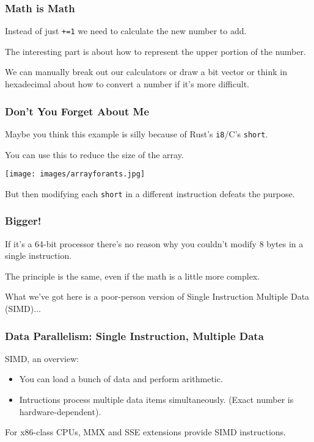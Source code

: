 \begin{frame}
\frametitle{Math is Math}

Instead of just \texttt{+=1} we need to calculate the new number to add. 

The interesting part is about how to represent the upper portion of the number.

We can manually break out our calculators or draw a bit vector or think in hexadecimal about how to convert a number if it's more difficult.


\end{frame}

\begin{frame}
\frametitle{Don't You Forget About Me}

Maybe you think this example is silly because of  Rust's \texttt{i8}/C's \texttt{short}.

You can use this to reduce the size of the array.

\begin{center}
	\texttt{[image: images/arrayforants.jpg]}
\end{center}

But then modifying each \texttt{short} in a different instruction defeats the purpose.

\end{frame}


\begin{frame}
\frametitle{Bigger!}

If it's a 64-bit processor there's no reason why you couldn't modify 8 bytes in a single instruction. 

The principle is the same, even if the math is a little more complex.

What we've got here is a poor-person version of Single Instruction Multiple Data (SIMD)...

\end{frame}



\begin{frame}
  \frametitle{Data Parallelism: Single Instruction, Multiple Data}

  
   SIMD, an overview:
    \begin{itemize}
    \item You can load a bunch of data and perform 
      arithmetic.
    \item Intructions process multiple data items simultaneously.
      (Exact number is hardware-dependent).
    \end{itemize}
    For x86-class CPUs, MMX and SSE extensions provide SIMD instructions.
  
\end{frame}


